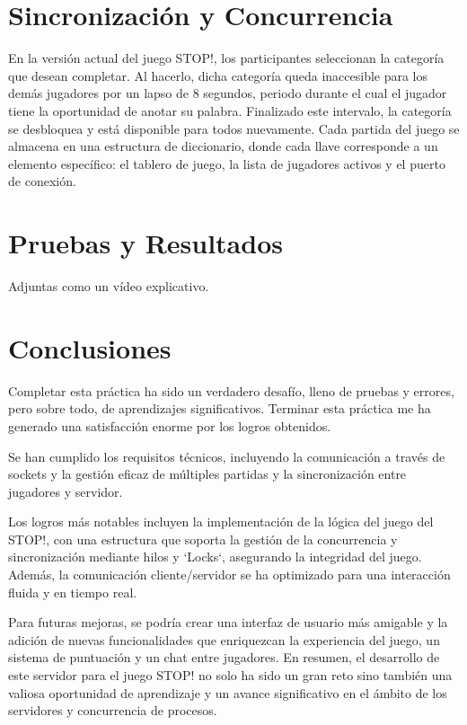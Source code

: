 \documentclass{article}
\begin{document}
\section{Sincronización y Concurrencia}

En la versión actual del juego STOP!, los participantes seleccionan la categoría que desean completar. Al hacerlo, dicha categoría queda inaccesible para los demás jugadores 
por un lapso de 8 segundos, periodo durante el cual el jugador tiene la oportunidad de anotar su palabra. Finalizado este intervalo, la categoría se desbloquea y está disponible 
para todos nuevamente. Cada partida del juego se almacena en una estructura de diccionario, donde cada llave corresponde a un elemento específico: el tablero de juego, la lista 
de jugadores activos y el puerto de conexión.

\section{Pruebas y Resultados}
Adjuntas como un vídeo explicativo.

\section{Conclusiones}
Completar esta práctica ha sido un verdadero desafío, lleno de pruebas y errores, pero sobre todo, de aprendizajes significativos. Terminar esta práctica me ha generado una 
satisfacción enorme por los logros obtenidos.

Se han cumplido los requisitos técnicos, incluyendo la comunicación a través de sockets y la gestión eficaz de múltiples partidas y la sincronización entre jugadores y servidor.

Los logros más notables incluyen la implementación de la lógica del juego del STOP!, con una estructura que soporta la gestión de la concurrencia y sincronización mediante hilos y `Locks`, asegurando la integridad del juego. Además, la comunicación cliente/servidor se ha optimizado 
para una interacción fluida y en tiempo real.

Para futuras mejoras, se podría crear una interfaz de usuario más amigable y la adición de nuevas funcionalidades que enriquezcan la experiencia del juego, un sistema de 
puntuación y un chat entre jugadores. En resumen, el desarrollo de este servidor para el juego STOP! no solo ha sido un gran reto sino también una 
valiosa oportunidad de aprendizaje y un avance significativo en el ámbito de los servidores y concurrencia de procesos.
\end{document}
